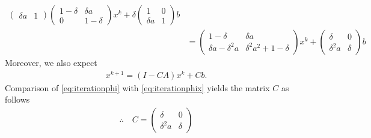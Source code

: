 \documentclass[12pt]{article}
\begin{document}
\begin{enumerate}
\begin{align}
\begin{pmatrix}
			      \delta a & 1
		      \end{pmatrix}
		      \begin{pmatrix}
			      1-\delta & \delta a \\
			      0        & 1-\delta
		      \end{pmatrix}
		      x^{k}
		      + \delta \begin{pmatrix}
			      1        & 0 \\
			      \delta a & 1
		      \end{pmatrix}b      \\
		              & =
		      \begin{pmatrix}
			      1 -\delta              & \delta a              \\
			      \delta a -  \delta^2 a & \delta^2 a^2+1-\delta
		      \end{pmatrix}
		      x^{k}
		      +  \begin{pmatrix}
			      \delta     & 0      \\
			      \delta^2 a & \delta
		      \end{pmatrix}b
	      \end{align}
	      Moreover, we also expect
	      \begin{align}
		      \label{eq:iterationphi}
		      x^{k+1} = (I-CA) x^{k} + Cb.
	      \end{align}
	      Comparison of \eqref{eq:iterationphi} with \eqref{eq:iterationphix} yields
	      the matrix $C$ as follows
	      \begin{align}
		      \therefore\quad
		      \boxed{
			      C =
			      \begin{pmatrix}
				      \delta     & 0      \\
				      \delta^2 a & \delta
			      \end{pmatrix}
		      }
	      \end{align}
	      

\end{enumerate}
\end{document}

